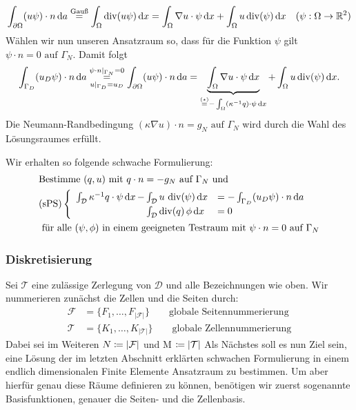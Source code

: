 \[ \int_{\partial\Omega} (u\psi) \cdot n \, \mathrm{d} a \stackrel{\text{Gauß}}{=} 
 \int_{\Omega} \operatorname{div}(u\psi) \, \mathrm{d} x = \int_{\Omega} \nabla u \cdot \psi \, \mathrm{d} x + \int_{\Omega} u \operatorname{div}(\psi) \, \mathrm{d} x \quad (\psi:\Omega \to \mathbb{R}^2) \]
Wählen wir nun unseren Ansatzraum so, dass  für die Funktion $ \psi$ gilt $ \psi \cdot n = 0 \text{ auf } \Gamma_N $. Damit folgt
\begin{align*}
\int_{\Gamma_D} (u_D\psi) \cdot n \, \mathrm{d} a \overset{\psi \cdot n|_{\Gamma_N} = 0}{\underset{u |_{\Gamma_D} = u_D} {=}} \int_{\partial\Omega} (u\psi) \cdot n \, \mathrm{d} a = \underbrace{\int_{\Omega} \nabla u \cdot \psi \, \mathrm{d} x}_{\stackrel{(\star)}{=}- \int_{\Omega} (\kappa^{-1} q) \cdot \psi \, \mathrm{d} x } + \int_{\Omega} u \operatorname{div}(\psi) \, \mathrm{d} x.
\end{align*}
Die Neumann-Randbedingung $ (\kappa\nabla u) \cdot n = g_N \text{ auf } \Gamma_N $ wird durch die Wahl des Lösungsraumes erfüllt.


Wir erhalten so folgende schwache Formulierung:
\label{sPS}
\begin{align*}
&\text{Bestimme } (q,u) \text{ mit } q\cdot n = -g_N \text{ auf } \Gamma_N \text{ und}\\
&\text{(sPS)}\begin{cases}
\begin{array}{llll}
\int_{\mathcal{D}} \kappa^{-1} q \cdot \psi \, \mathrm{d} x \, - \mkern-15mu &\int_{\mathcal{D}} u \, \operatorname{div}(\psi) \, \mathrm{d} x &= - \int_{\Gamma_D} (u_D \psi) \cdot n \, \mathrm{d} a\\
&\int_{\mathcal{D}} \operatorname{div}(q) \, \phi \, \mathrm{d} x &= 0
\end{array}
\end{cases}	\\
&\text{ für alle } (\psi, \phi) \text{ in einem geeigneten Testraum mit } \psi \cdot n = 0 \text{ auf } \Gamma_N 
\end{align*}

\subsubsection{Diskretisierung}
Sei $ \mathcal{T}  $ eine zulässige Zerlegung von $ \mathcal{D} $ und alle Bezeichnungen wie oben.
Wir nummerieren zunächst die Zellen und die Seiten durch:
\begin{align*}
	\mathcal{F} &= \{ F_1,\dots,F_{|\mathcal{F}|}\} \qquad \text{globale Seitennummerierung} \\
	\mathcal{T} &=  \{ K_1,\dots,K_{|\mathcal{T}|}\} \qquad \text{globale Zellennummerierung}
\end{align*}
Dabei sei im Weiteren $ N \coloneqq | \mathcal{F} | $ und M $\coloneqq | \mathcal{T} |$
Als Nächstes soll es nun Ziel sein, eine Lösung der im letzten Abschnitt erklärten schwachen Formulierung in einem endlich dimensionalen Finite Elemente Ansatzraum zu bestimmen. Um aber hierfür genau diese Räume definieren zu können, benötigen wir zuerst sogenannte Basisfunktionen, genauer die Seiten- und die Zellenbasis.\\

